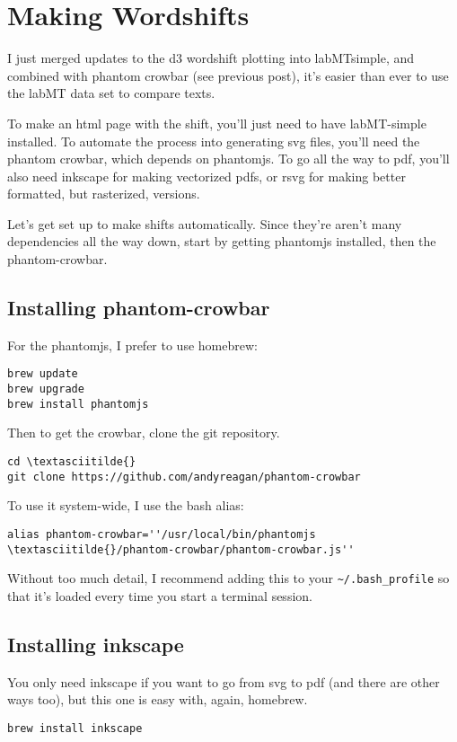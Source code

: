 \section{Making Wordshifts}
\label{wordshifts::doc}\label{wordshifts:making-wordshifts}
I just merged updates to the d3 wordshift plotting into labMTsimple, and combined with phantom crowbar (see previous post), it's easier than ever to use the labMT data set to compare texts.

To make an html page with the shift, you'll just need to have labMT-simple installed.
To automate the process into generating svg files, you'll need the phantom crowbar, which depends on phantomjs.
To go all the way to pdf, you'll also need inkscape for making vectorized pdfs, or rsvg for making better formatted, but rasterized, versions.

Let's get set up to make shifts automatically.
Since they're aren't many dependencies all the way down, start by getting phantomjs installed, then the phantom-crowbar.


\subsection{Installing phantom-crowbar}
\label{wordshifts:installing-phantom-crowbar}
For the phantomjs, I prefer to use homebrew:
\begin{lstlisting}
brew update
brew upgrade
brew install phantomjs
\end{lstlisting}

Then to get the crowbar, clone the git repository.
\begin{lstlisting}
cd \textasciitilde{}
git clone https://github.com/andyreagan/phantom-crowbar
\end{lstlisting}

To use it system-wide, I use the bash alias:
\begin{lstlisting}
alias phantom-crowbar=''/usr/local/bin/phantomjs \textasciitilde{}/phantom-crowbar/phantom-crowbar.js''
\end{lstlisting}

Without too much detail, I recommend adding this to your \lstinline{~/.bash_profile} so that it's loaded every time you start a terminal session.


\subsection{Installing inkscape}
\label{wordshifts:installing-inkscape}
You only need inkscape if you want to go from svg to pdf (and there are other ways too), but this one is easy with, again, homebrew.
\begin{lstlisting}
brew install inkscape
\end{lstlisting}



